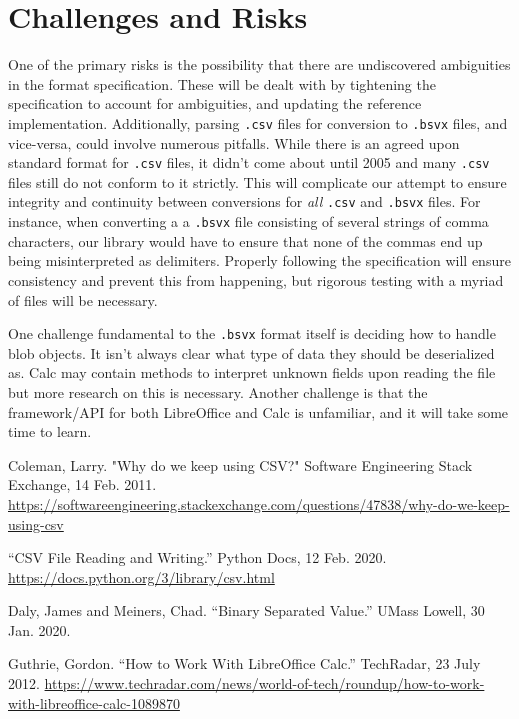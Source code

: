 \documentclass[10pt]{article}
\begin{document}
\section*{Challenges and Risks}

One of the primary risks is the possibility that there are undiscovered ambiguities in the format specification.
These will be dealt with by tightening the specification to account for ambiguities, and updating the reference implementation.
Additionally, parsing \texttt{.csv} files for conversion to \texttt{.bsvx} files, and vice-versa, could involve numerous pitfalls.
While there is an agreed upon standard format for \texttt{.csv} files, it didn’t come about until 2005 and many \texttt{.csv} files still do not conform to it strictly.
This will complicate our attempt to ensure integrity and continuity between conversions for \textit{all} \texttt{.csv} and \texttt{.bsvx} files.
For instance, when converting a a \texttt{.bsvx} file consisting of several strings of comma characters, our library would have to ensure that none of the commas end up being misinterpreted as delimiters.
Properly following the specification will ensure consistency and prevent this from happening, but rigorous testing with a myriad of files will be necessary.

\indent{}
One challenge fundamental to the \texttt{.bsvx} format itself is deciding how to handle blob objects.
It isn’t always clear what type of data they should be deserialized as.
Calc may contain methods to interpret unknown fields upon reading the file but more research on this is necessary.
Another challenge is that the framework/API for both LibreOffice and Calc is unfamiliar, and it will take some time to learn.

\clearpage
{}
\printnoidxglossary[nonumberlist]

\clearpage
\begin{thebibliography}{9}

    Coleman, Larry.
    "Why do we keep using CSV?"
    Software Engineering Stack Exchange,
    14 Feb. 2011.
    \url{https://softwareengineering.stackexchange.com/questions/47838/why-do-we-keep-using-csv}

    “CSV File Reading and Writing.”
    Python Docs,
    12 Feb. 2020.
    \url{https://docs.python.org/3/library/csv.html}

    Daly, James and Meiners, Chad.
    “Binary Separated Value.”
    UMass Lowell,
    30 Jan. 2020.

    Guthrie, Gordon.
    “How to Work With LibreOffice Calc.”
    TechRadar,
    23 July 2012.
    \url{https://www.techradar.com/news/world-of-tech/roundup/how-to-work-with-libreoffice-calc-1089870}
  
\end{thebibliography}
\end{document}
